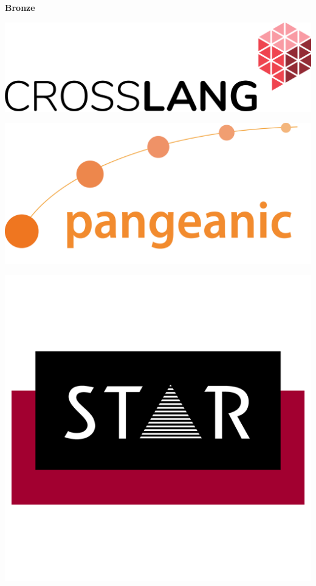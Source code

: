\documentclass[11pt,oneside]{book}
\begin{document}
  \bigskip
  \bigskip
    \begin{samepage}
  \noindent
  {\Large \textbf{Bronze}}

  \nopagebreak
            \begin{minipage}[c][0.21\linewidth][c]{0.17\linewidth}
        \includegraphics[width=\linewidth]{eamt_volume_1/sponsor_logos/CrossLang-logo-RGB-HR.png}
      \end{minipage}\hspace{0.05\linewidth}
          \begin{minipage}[c][0.21\linewidth][c]{0.17\linewidth}
        \includegraphics[width=\linewidth]{eamt_volume_1/sponsor_logos/Logo_Pangeanic_Alta.png}
      \end{minipage}\hspace{0.05\linewidth}
          \begin{minipage}[c][0.21\linewidth][c]{0.17\linewidth}
        \includegraphics[width=\linewidth]{eamt_volume_1/sponsor_logos/STAR-Signet-rgb.png}

\end{minipage}
\end{samepage}
\end{document}
